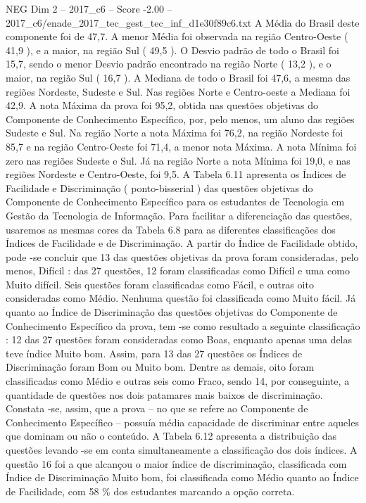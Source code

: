 \begin{textsample}{NEG Dim 2 – 2017\_c6 – Score -2.00 – 2017\_c6/enade\_2017\_tec\_gest\_tec\_inf\_d1e30f89c6.txt}
A Média do Brasil deste componente foi de 47,7.
A menor Média foi observada na região Centro-Oeste ( 41,9 ), e a maior, na região Sul ( 49,5 ).
O Desvio padrão de todo o Brasil foi 15,7, sendo o menor Desvio padrão encontrado na região Norte ( 13,2 ), e o maior, na região Sul ( 16,7 ).
A Mediana de todo o Brasil foi 47,6, a mesma das regiões Nordeste, Sudeste e Sul.
Nas regiões Norte e Centro-oeste a Mediana foi 42,9.
A nota Máxima da prova foi 95,2, obtida nas questões objetivas do Componente de Conhecimento Específico, por, pelo menos, um aluno das regiões Sudeste e Sul.
Na região Norte a nota Máxima foi 76,2, na região Nordeste foi 85,7 e na região Centro-Oeste foi 71,4, a menor nota Máxima.
A nota Mínima foi zero nas regiões Sudeste e Sul.
Já na região Norte a nota Mínima foi 19,0, e nas regiões Nordeste e Centro-Oeste, foi 9,5.
A Tabela 6.11 apresenta os Índices de Facilidade e Discriminação ( ponto-bisserial ) das questões objetivas do Componente de Conhecimento Específico para os estudantes de Tecnologia em Gestão da Tecnologia de Informação.
Para facilitar a diferenciação das questões, usaremos as mesmas cores da Tabela 6.8 para as diferentes classificações dos Índices de Facilidade e de Discriminação.
A partir do Índice de Facilidade obtido, pode -se concluir que 13 das questões objetivas da prova foram consideradas, pelo menos, Difícil : das 27 questões, 12 foram classificadas como Difícil e uma como Muito difícil.
Seis questões foram classificadas como Fácil, e outras oito consideradas como Médio.
Nenhuma questão foi classificada como Muito fácil.
Já quanto ao Índice de Discriminação das questões objetivas do Componente de Conhecimento Específico da prova, tem -se como resultado a seguinte classificação : 12 das 27 questões foram consideradas como Boas, enquanto apenas uma delas teve índice Muito bom.
Assim, para 13 das 27 questões os Índices de Discriminação foram Bom ou Muito bom.
Dentre as demais, oito foram classificadas como Médio e outras seis como Fraco, sendo 14, por conseguinte, a quantidade de questões nos dois patamares mais baixos de discriminação.
Constata -se, assim, que a prova – no que se refere ao Componente de Conhecimento Específico – possuía média capacidade de discriminar entre aqueles que dominam ou não o conteúdo.
A Tabela 6.12 apresenta a distribuição das questões levando -se em conta simultaneamente a classificação dos dois índices.
A questão 16 foi a que alcançou o maior índice de discriminação, classificada com Índice de Discriminação Muito bom, foi classificada como Médio quanto ao Índice de Facilidade, com 58 \% dos estudantes marcando a opção correta.

\end{textsample}
